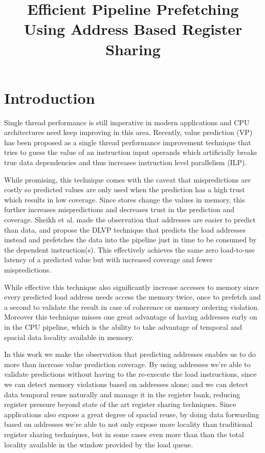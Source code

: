 \documentclass{sig-alternate}
\title{Efficient Pipeline Prefetching Using Address Based Register Sharing}
\begin{document}
\maketitle
\thispagestyle{firstpage}
\pagestyle{plain}




\begin{abstract}



\end{abstract}




\section{Introduction}
Single thread performance is still imperative in modern applications and CPU architectures need keep improving in this area. Recently, value prediction (VP) has been proposed as a single thread performance improvement technique that tries to guess the value of an instruction input operands which artificially breaks true data dependencies and thus increases instruction level parallelism (ILP).

While promising, this technique comes with the caveat that mispredictions are costly so predicted values are only used when the prediction has a high trust which results in low coverage. Since stores change the values in memory, this further increases mispredictions and decreases trust in the prediction and coverage. Sheikh et al. made the observation that addresses are easier to predict than data, and propose the DLVP technique that predicts the load addresses instead and prefetches the data into the pipeline just in time to be consumed by the dependent instruction(s). This effectively achieves the same zero load-to-use latency of a predicted value but with increased coverage and fewer mispredictions.

While effective this technique also significantly increase accesses to memory since every predicted load address needs access the memory twice, once to prefetch and a second to validate the result in case of coherence or memory ordering violation. Moreover this technique misses one great advantage of having addresses early on in the CPU pipeline, which is the ability to take advantage of temporal and spacial data locality available in memory.

In this work we make the observation that predicting addresses enables us to do more than increase value prediction coverage. By using addresses we're able to validate predictions without having to the re-execute the load instructions, since we can detect memory violations based on addresses alone; and we can detect data temporal reuse naturally and manage it in the register bank, reducing register pressure beyond state of the art register sharing techniques. Since applications also expose a great degree of spacial reuse, by doing data forwarding based on addresses we're able to not only expose more locality than traditional register sharing techniques, but in some cases even more than than the total locality available in the window provided by the load queue.   
\end{document}
